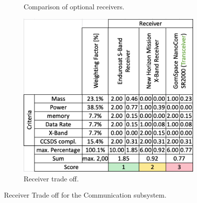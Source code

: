 \begin{figure}[h]
\begin{subfigure}[b]{0.49\textwidth}
         \caption{Comparison of optional receivers.}
         \label{fig:Values_Rec}
     \end{subfigure}
     \hfill
     \begin{subfigure}[b]{0.49\textwidth}
         \centering
         \includegraphics[width=\textwidth]{Media/Trade_off/Receiver/TradeOff_Rec.png}
         \caption{Receiver trade off.}
         \label{fig:TradeOff_Rec}
     \end{subfigure}
     \hfill
     \caption{Receiver Trade off for the Communication subsystem.}
     \label{TrOff_Trans}
\end{figure}

